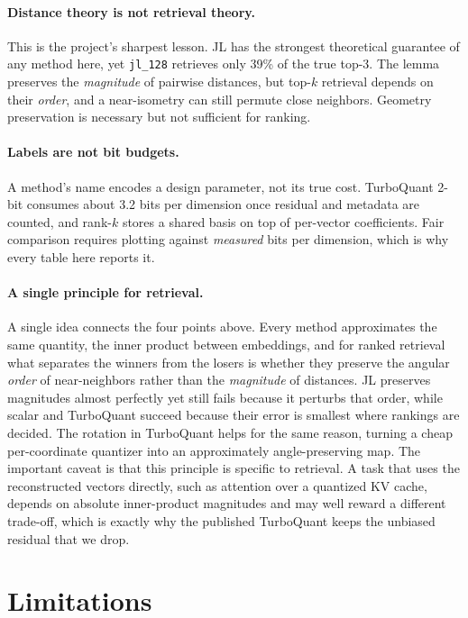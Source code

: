 \documentclass[11pt]{article}
\begin{document}
\paragraph{Distance theory is not retrieval theory.} This is the project's sharpest lesson. JL has the strongest theoretical guarantee of any method here, yet \texttt{jl\_128} retrieves only 39\% of the true top-3. The lemma preserves the \emph{magnitude} of pairwise distances, but top-$k$ retrieval depends on their \emph{order}, and a near-isometry can still permute close neighbors. Geometry preservation is necessary but not sufficient for ranking.

\paragraph{Labels are not bit budgets.} A method's name encodes a design parameter, not its true cost. TurboQuant 2-bit consumes about 3.2 bits per dimension once residual and metadata are counted, and rank-$k$ stores a shared basis on top of per-vector coefficients. Fair comparison requires plotting against \emph{measured} bits per dimension, which is why every table here reports it.

\paragraph{A single principle for retrieval.} A single idea connects the four points above. Every method approximates the same quantity, the inner product between embeddings, and for ranked retrieval what separates the winners from the losers is whether they preserve the angular \emph{order} of near-neighbors rather than the \emph{magnitude} of distances. JL preserves magnitudes almost perfectly yet still fails because it perturbs that order, while scalar and TurboQuant succeed because their error is smallest where rankings are decided. The rotation in TurboQuant helps for the same reason, turning a cheap per-coordinate quantizer into an approximately angle-preserving map. The important caveat is that this principle is specific to retrieval. A task that uses the reconstructed vectors directly, such as attention over a quantized KV cache, depends on absolute inner-product magnitudes and may well reward a different trade-off, which is exactly why the published TurboQuant keeps the unbiased residual that we drop.

\section{Limitations}
\end{document}
